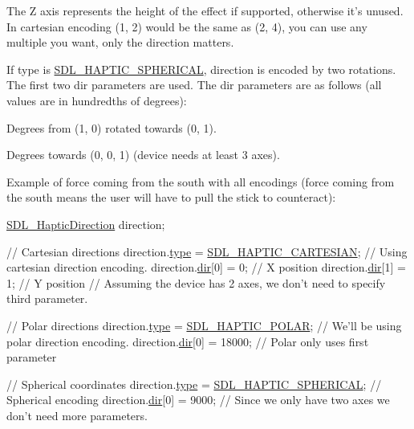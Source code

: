 The Z axis represents the height of the effect if supported, otherwise it's unused. In cartesian encoding (1, 2) would be the same as (2, 4), you can use any multiple you want, only the direction matters.

If type is \hyperlink{_s_d_l__haptic_8h_a1fcf7cb0eaf3c39b16ba266054e25aff}{S\-D\-L\-\_\-\-H\-A\-P\-T\-I\-C\-\_\-\-S\-P\-H\-E\-R\-I\-C\-A\-L}, direction is encoded by two rotations. The first two {\ttfamily dir} parameters are used. The {\ttfamily dir} parameters are as follows (all values are in hundredths of degrees)\-:
\begin{DoxyItemize}
\item Degrees from (1, 0) rotated towards (0, 1).
\item Degrees towards (0, 0, 1) (device needs at least 3 axes).
\end{DoxyItemize}

Example of force coming from the south with all encodings (force coming from the south means the user will have to pull the stick to counteract)\-: 
\begin{DoxyCode}
\hyperlink{struct_s_d_l___haptic_direction}{SDL\_HapticDirection} direction;

\textcolor{comment}{// Cartesian directions}
direction.\hyperlink{struct_s_d_l___haptic_direction_acd6830ad68c4ba2af16057fa418087cc}{type} = \hyperlink{_s_d_l__haptic_8h_af8b2430a363a968de2a5b64c8f663d3b}{SDL\_HAPTIC\_CARTESIAN}; \textcolor{comment}{// Using cartesian direction encoding.}
direction.\hyperlink{struct_s_d_l___haptic_direction_a6cebd8118a3e61e36bd0c503ae020362}{dir}[0] = 0; \textcolor{comment}{// X position}
direction.\hyperlink{struct_s_d_l___haptic_direction_a6cebd8118a3e61e36bd0c503ae020362}{dir}[1] = 1; \textcolor{comment}{// Y position}
\textcolor{comment}{// Assuming the device has 2 axes, we don't need to specify third parameter.}

\textcolor{comment}{// Polar directions}
direction.\hyperlink{struct_s_d_l___haptic_direction_acd6830ad68c4ba2af16057fa418087cc}{type} = \hyperlink{_s_d_l__haptic_8h_acdc35e97e5525472054a67b76e518f3b}{SDL\_HAPTIC\_POLAR}; \textcolor{comment}{// We'll be using polar direction encoding.}
direction.\hyperlink{struct_s_d_l___haptic_direction_a6cebd8118a3e61e36bd0c503ae020362}{dir}[0] = 18000; \textcolor{comment}{// Polar only uses first parameter}

\textcolor{comment}{// Spherical coordinates}
direction.\hyperlink{struct_s_d_l___haptic_direction_acd6830ad68c4ba2af16057fa418087cc}{type} = \hyperlink{_s_d_l__haptic_8h_a1fcf7cb0eaf3c39b16ba266054e25aff}{SDL\_HAPTIC\_SPHERICAL}; \textcolor{comment}{// Spherical encoding}
direction.\hyperlink{struct_s_d_l___haptic_direction_a6cebd8118a3e61e36bd0c503ae020362}{dir}[0] = 9000; \textcolor{comment}{// Since we only have two axes we don't need more parameters.}
\end{DoxyCode}


